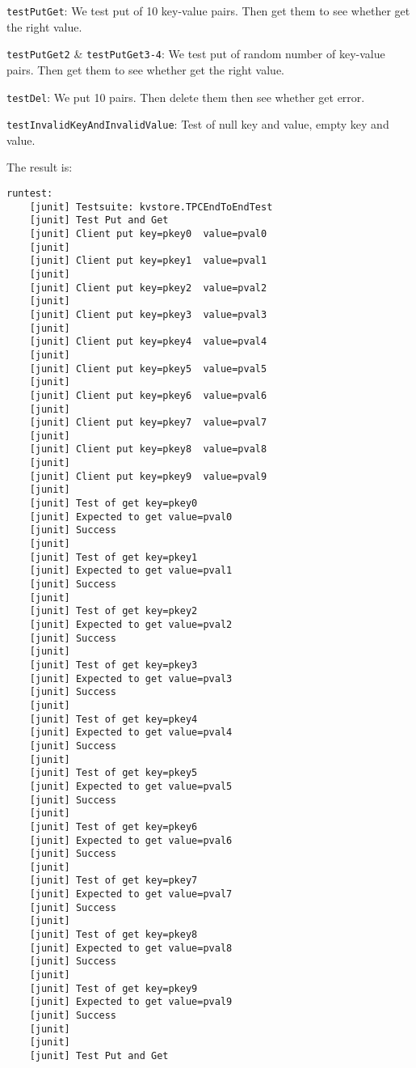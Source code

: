 \documentclass{article}
\begin{document}
\begin{compactitem}
\item \texttt{testPutGet}: We test put of 10 key-value pairs. Then get them to see whether get the right value.
\item \texttt{testPutGet2} \& \texttt{testPutGet3-4}: We test put of random number of key-value pairs. Then get them to see whether get the right value.
\item \texttt{testDel}: We put 10 pairs. Then delete them then see whether get error.
\item \texttt{testInvalidKeyAndInvalidValue}: Test of null key and value, empty key and value.
\end{compactitem}

The result is:
\begin{lstlisting}
runtest:
    [junit] Testsuite: kvstore.TPCEndToEndTest
    [junit] Test Put and Get
    [junit] Client put key=pkey0  value=pval0
    [junit] 
    [junit] Client put key=pkey1  value=pval1
    [junit] 
    [junit] Client put key=pkey2  value=pval2
    [junit] 
    [junit] Client put key=pkey3  value=pval3
    [junit] 
    [junit] Client put key=pkey4  value=pval4
    [junit] 
    [junit] Client put key=pkey5  value=pval5
    [junit] 
    [junit] Client put key=pkey6  value=pval6
    [junit] 
    [junit] Client put key=pkey7  value=pval7
    [junit] 
    [junit] Client put key=pkey8  value=pval8
    [junit] 
    [junit] Client put key=pkey9  value=pval9
    [junit] 
    [junit] Test of get key=pkey0
    [junit] Expected to get value=pval0
    [junit] Success
    [junit] 
    [junit] Test of get key=pkey1
    [junit] Expected to get value=pval1
    [junit] Success
    [junit] 
    [junit] Test of get key=pkey2
    [junit] Expected to get value=pval2
    [junit] Success
    [junit] 
    [junit] Test of get key=pkey3
    [junit] Expected to get value=pval3
    [junit] Success
    [junit] 
    [junit] Test of get key=pkey4
    [junit] Expected to get value=pval4
    [junit] Success
    [junit] 
    [junit] Test of get key=pkey5
    [junit] Expected to get value=pval5
    [junit] Success
    [junit] 
    [junit] Test of get key=pkey6
    [junit] Expected to get value=pval6
    [junit] Success
    [junit] 
    [junit] Test of get key=pkey7
    [junit] Expected to get value=pval7
    [junit] Success
    [junit] 
    [junit] Test of get key=pkey8
    [junit] Expected to get value=pval8
    [junit] Success
    [junit] 
    [junit] Test of get key=pkey9
    [junit] Expected to get value=pval9
    [junit] Success
    [junit] 
    [junit] 
    [junit] Test Put and Get

\end{lstlisting}
\end{document}
